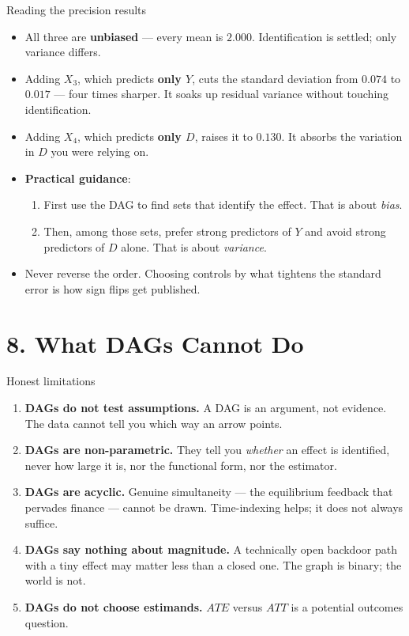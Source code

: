 \documentclass[
  11pt,
  ignorenonframetext,
  aspectratio=169,
]{beamer}
\providecommand{\tightlist}{%
  \setlength{\itemsep}{0pt}\setlength{\parskip}{0pt}}
\begin{document}
\begin{frame}{Reading the precision results}
\protect{}\label{reading-the-precision-results}
\begin{itemize}
\item
  All three are \textbf{unbiased} --- every mean is \(2.000\).
  Identification is settled; only variance differs.
\item
  Adding \(X_3\), which predicts \textbf{only \(Y\)}, cuts the standard
  deviation from \(0.074\) to \(0.017\) --- four times sharper. It soaks
  up residual variance without touching identification.
\item
  Adding \(X_4\), which predicts \textbf{only \(D\)}, raises it to
  \(0.130\). It absorbs the variation in \(D\) you were relying on.
\item
  \textbf{Practical guidance}:

  \begin{enumerate}
  \tightlist
  \item
    First use the DAG to find sets that identify the effect. That is
    about \emph{bias}.
  \item
    Then, among those sets, prefer strong predictors of \(Y\) and avoid
    strong predictors of \(D\) alone. That is about \emph{variance}.
  \end{enumerate}
\item
  Never reverse the order. Choosing controls by what tightens the
  standard error is how sign flips get published.
\end{itemize}
\end{frame}

\section{8. What DAGs Cannot Do}\label{what-dags-cannot-do}

\begin{frame}{Honest limitations}
\protect{}\label{honest-limitations}
\begin{enumerate}
\tightlist
\item
  \textbf{DAGs do not test assumptions.} A DAG is an argument, not
  evidence. The data cannot tell you which way an arrow points.
\item
  \textbf{DAGs are non-parametric.} They tell you \emph{whether} an
  effect is identified, never how large it is, nor the functional form,
  nor the estimator.
\item
  \textbf{DAGs are acyclic.} Genuine simultaneity --- the equilibrium
  feedback that pervades finance --- cannot be drawn. Time-indexing
  helps; it does not always suffice.
\item
  \textbf{DAGs say nothing about magnitude.} A technically open backdoor
  path with a tiny effect may matter less than a closed one. The graph
  is binary; the world is not.
\item
  \textbf{DAGs do not choose estimands.} \(ATE\) versus \(ATT\) is a
  potential outcomes question.
\end{enumerate}
\end{frame}
\end{document}
